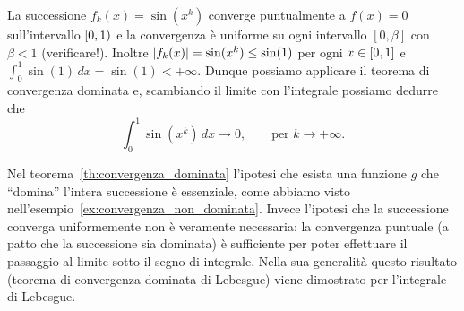 \begin{example}
La successione $f_k(x) = \sin(x^k)$ converge puntualmente a $f(x)=0$ sull'intervallo
$\left[0,1\right)$ e la convergenza è uniforme su ogni intervallo $[0,\beta]$
con $\beta < 1$ (verificare!).
Inoltre ${\left|f_k(x)\right|} = \sin(x^k) \le \sin(1)$ per ogni $x\in {\left[ 0,1 \right]}$
e $\int_0^1 \sin(1)\, dx = \sin(1)< +\infty$.
Dunque possiamo applicare il teorema di convergenza dominata e,
scambiando il limite con l'integrale possiamo dedurre che
\[
  \int_0^1 \sin (x^k)\, dx \to 0, \qquad \text{per $k\to +\infty$.}
\]
\end{example}

Nel teorema~\ref{th:convergenza_dominata}
l'ipotesi che esista una funzione $g$ che ``domina'' l'intera successione 
è essenziale, come abbiamo visto nell'esempio~\ref{ex:convergenza_non_dominata}.
Invece l'ipotesi che la successione converga uniformemente non è veramente necessaria:
la convergenza puntuale (a patto che la successione sia dominata) è sufficiente 
per poter effettuare il passaggio al limite sotto il segno di integrale.
Nella sua generalità questo risultato (teorema di convergenza dominata di Lebesgue) 
viene dimostrato per l'integrale di Lebesgue.
%
%
%
%
%

